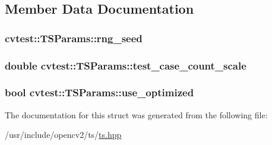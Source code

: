 \subsection{Member Data Documentation}
\hypertarget{structcvtest_1_1TSParams_a2c721e0a6684a2d0f04a786e0c2393a2}{
\subsubsection[{rng\-\_\-seed}]{ cvtest\-::\-T\-S\-Params\-::rng\-\_\-seed}}\label{structcvtest_1_1TSParams_a2c721e0a6684a2d0f04a786e0c2393a2}
\hypertarget{structcvtest_1_1TSParams_a0080c0b8b5fc3c0ccb42fa47fe8041ff}{
\subsubsection[{test\-\_\-case\-\_\-count\-\_\-scale}]{\setlength{\rightskip}{0pt plus 5cm}double cvtest\-::\-T\-S\-Params\-::test\-\_\-case\-\_\-count\-\_\-scale}}\label{structcvtest_1_1TSParams_a0080c0b8b5fc3c0ccb42fa47fe8041ff}
\hypertarget{structcvtest_1_1TSParams_a9424a5a850fabce99d334de217f1f68d}{
\subsubsection[{use\-\_\-optimized}]{\setlength{\rightskip}{0pt plus 5cm}bool cvtest\-::\-T\-S\-Params\-::use\-\_\-optimized}}\label{structcvtest_1_1TSParams_a9424a5a850fabce99d334de217f1f68d}


The documentation for this struct was generated from the following file\-:\begin{DoxyCompactItemize}
\item 
/usr/include/opencv2/ts/\hyperlink{ts_8hpp}{ts.\-hpp}\end{DoxyCompactItemize}
